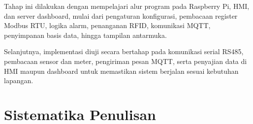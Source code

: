 Tahap ini dilakukan dengan mempelajari alur program pada Raspberry Pi, HMI, dan server dashboard, mulai dari pengaturan konfigurasi, pembacaan register Modbus RTU, logika alarm, penanganan RFID, komunikasi MQTT, penyimpanan basis data, hingga tampilan antarmuka.

Selanjutnya, implementasi diuji secara bertahap pada komunikasi serial RS485, pembacaan sensor dan meter, pengiriman pesan MQTT, serta penyajian data di HMI maupun dashboard untuk memastikan sistem berjalan sesuai kebutuhan lapangan.

\section{Sistematika Penulisan}

